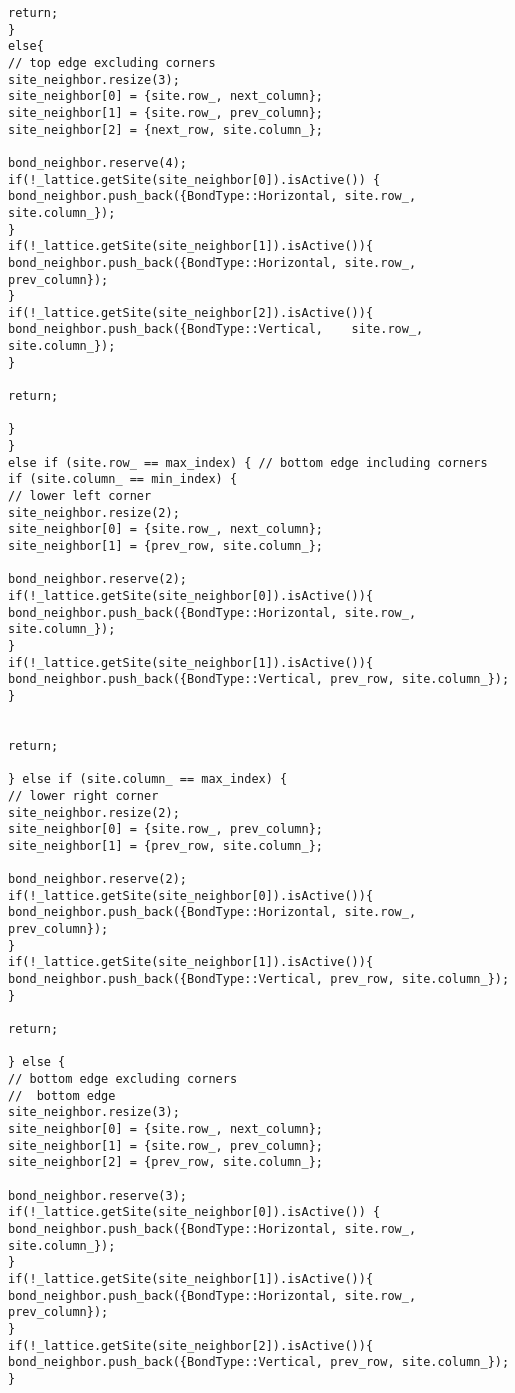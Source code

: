 \begin{lstlisting}[style=CStyle]
return;
}
else{
// top edge excluding corners
site_neighbor.resize(3);
site_neighbor[0] = {site.row_, next_column};
site_neighbor[1] = {site.row_, prev_column};
site_neighbor[2] = {next_row, site.column_};

bond_neighbor.reserve(4);
if(!_lattice.getSite(site_neighbor[0]).isActive()) {
bond_neighbor.push_back({BondType::Horizontal, site.row_, site.column_});
}
if(!_lattice.getSite(site_neighbor[1]).isActive()){
bond_neighbor.push_back({BondType::Horizontal, site.row_, prev_column});
}
if(!_lattice.getSite(site_neighbor[2]).isActive()){
bond_neighbor.push_back({BondType::Vertical,    site.row_, site.column_});
}

return;

}
}
else if (site.row_ == max_index) { // bottom edge including corners
if (site.column_ == min_index) {
// lower left corner
site_neighbor.resize(2);
site_neighbor[0] = {site.row_, next_column};
site_neighbor[1] = {prev_row, site.column_};

bond_neighbor.reserve(2);
if(!_lattice.getSite(site_neighbor[0]).isActive()){
bond_neighbor.push_back({BondType::Horizontal, site.row_, site.column_});
}
if(!_lattice.getSite(site_neighbor[1]).isActive()){
bond_neighbor.push_back({BondType::Vertical, prev_row, site.column_});
}


return;

} else if (site.column_ == max_index) {
// lower right corner
site_neighbor.resize(2);
site_neighbor[0] = {site.row_, prev_column};
site_neighbor[1] = {prev_row, site.column_};

bond_neighbor.reserve(2);
if(!_lattice.getSite(site_neighbor[0]).isActive()){
bond_neighbor.push_back({BondType::Horizontal, site.row_, prev_column});
}
if(!_lattice.getSite(site_neighbor[1]).isActive()){
bond_neighbor.push_back({BondType::Vertical, prev_row, site.column_});
}

return;

} else {
// bottom edge excluding corners
//  bottom edge
site_neighbor.resize(3);
site_neighbor[0] = {site.row_, next_column};
site_neighbor[1] = {site.row_, prev_column};
site_neighbor[2] = {prev_row, site.column_};

bond_neighbor.reserve(3);
if(!_lattice.getSite(site_neighbor[0]).isActive()) {
bond_neighbor.push_back({BondType::Horizontal, site.row_, site.column_});
}
if(!_lattice.getSite(site_neighbor[1]).isActive()){
bond_neighbor.push_back({BondType::Horizontal, site.row_, prev_column});
}
if(!_lattice.getSite(site_neighbor[2]).isActive()){
bond_neighbor.push_back({BondType::Vertical, prev_row, site.column_});
}


\end{lstlisting}
